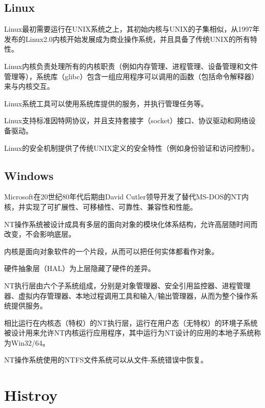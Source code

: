 \subsection{Linux}

Linux最初需要运行在UNIX系统之上，其初始内核与UNIX的子集相似，从1997年发布的Linux2.0内核开始发展成为商业操作系统，并且具备了传统UNIX的所有特性。

Linux内核负责处理所有的内核职责（例如内存管理、进程管理、设备管理和文件管理等），系统库（glibc）包含一组应用程序可以调用的函数（包括命令解释器）来与内核交互。

Linux系统工具可以使用系统库提供的服务，并执行管理任务等。

Linux支持标准因特网协议，并且支持套接字（socket）接口、协议驱动和网络设备驱动。

Linux的安全机制提供了传统UNIX定义的安全特性（例如身份验证和访问控制）。

\subsection{Windows}


Microsoft在20世纪80年代后期由David Cutler领导开发了替代MS-DOS的NT内核，并实现了可扩展性、可移植性、可靠性、兼容性和性能。

NT操作系统被设计成具有多层的面向对象的模块化体系结构，允许高层随时间而改变，不会影响底层。

内核是面向对象软件的一个片段，从而可以把任何实体都看作对象。

\begin{compactitem}
\item 硬件抽象层（HAL）为上层隐藏了硬件的差异。
\item  NT执行层由六个子系统组成，分别是对象管理器、安全引用监控器、进程管理器、虚拟内存管理器、本地过程调用工具和输入/输出管理器，从而为整个操作系统提供服务。
\item 相比运行在内核态（特权）的NT执行层，运行在用户态（无特权）的环境子系统被设计用来允许NT内核运行应用程序，其中运行为NT设计的应用的本地子系统称为Win32/64。
\end{compactitem}

NT操作系统使用的NTFS文件系统可以从文件-系统错误中恢复。










\section{Histroy}


